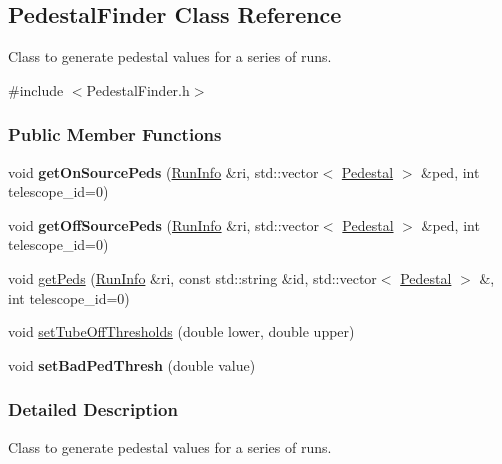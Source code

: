 \hypertarget{classPedestalFinder}{
\subsection{PedestalFinder Class Reference}
\label{classPedestalFinder}
}


Class to generate pedestal values for a series of runs.  




{\ttfamily \#include $<$PedestalFinder.h$>$}

\subsubsection*{Public Member Functions}
\begin{DoxyCompactItemize}
\item 
\hypertarget{classPedestalFinder_af3f4a0c919666cc2a5caa8f8100a95b2}{
void {\bfseries getOnSourcePeds} (\hyperlink{classRunInfo}{RunInfo} \&ri, std::vector$<$ \hyperlink{structPedestal}{Pedestal} $>$ \&ped, int telescope\_\-id=0)}
\label{classPedestalFinder_af3f4a0c919666cc2a5caa8f8100a95b2}

\item 
\hypertarget{classPedestalFinder_afd22e9acffa21d8be179d53938c93440}{
void {\bfseries getOffSourcePeds} (\hyperlink{classRunInfo}{RunInfo} \&ri, std::vector$<$ \hyperlink{structPedestal}{Pedestal} $>$ \&ped, int telescope\_\-id=0)}
\label{classPedestalFinder_afd22e9acffa21d8be179d53938c93440}

\item 
void \hyperlink{classPedestalFinder_a2f74e3e8ba1b0531f69949adb46d0657}{getPeds} (\hyperlink{classRunInfo}{RunInfo} \&ri, const std::string \&id, std::vector$<$ \hyperlink{structPedestal}{Pedestal} $>$ \&, int telescope\_\-id=0)
\item 
void \hyperlink{classPedestalFinder_add73283676010b81c0730dc22b38437e}{setTubeOffThresholds} (double lower, double upper)
\item 
\hypertarget{classPedestalFinder_a3d77ffa8a2364b28ea29f769620490a6}{
void {\bfseries setBadPedThresh} (double value)}
\label{classPedestalFinder_a3d77ffa8a2364b28ea29f769620490a6}

\end{DoxyCompactItemize}


\subsubsection{Detailed Description}
Class to generate pedestal values for a series of runs. 

